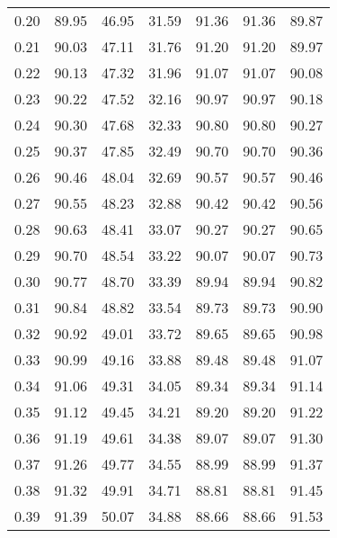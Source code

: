 \begin{tabular}{|c|c|c|c|c|c|c|}
      0.20 &     89.95 &     46.95 &      31.59 &   91.36 &      91.36 &         89.87 \\
      0.21 &     90.03 &     47.11 &      31.76 &   91.20 &      91.20 &         89.97 \\
      0.22 &     90.13 &     47.32 &      31.96 &   91.07 &      91.07 &         90.08 \\
      0.23 &     90.22 &     47.52 &      32.16 &   90.97 &      90.97 &         90.18 \\
      0.24 &     90.30 &     47.68 &      32.33 &   90.80 &      90.80 &         90.27 \\
      0.25 &     90.37 &     47.85 &      32.49 &   90.70 &      90.70 &         90.36 \\
      0.26 &     90.46 &     48.04 &      32.69 &   90.57 &      90.57 &         90.46 \\
      0.27 &     90.55 &     48.23 &      32.88 &   90.42 &      90.42 &         90.56 \\
      0.28 &     90.63 &     48.41 &      33.07 &   90.27 &      90.27 &         90.65 \\
      0.29 &     90.70 &     48.54 &      33.22 &   90.07 &      90.07 &         90.73 \\
      0.30 &     90.77 &     48.70 &      33.39 &   89.94 &      89.94 &         90.82 \\
      0.31 &     90.84 &     48.82 &      33.54 &   89.73 &      89.73 &         90.90 \\
      0.32 &     90.92 &     49.01 &      33.72 &   89.65 &      89.65 &         90.98 \\
      0.33 &     90.99 &     49.16 &      33.88 &   89.48 &      89.48 &         91.07 \\
      0.34 &     91.06 &     49.31 &      34.05 &   89.34 &      89.34 &         91.14 \\
      0.35 &     91.12 &     49.45 &      34.21 &   89.20 &      89.20 &         91.22 \\
      0.36 &     91.19 &     49.61 &      34.38 &   89.07 &      89.07 &         91.30 \\
      0.37 &     91.26 &     49.77 &      34.55 &   88.99 &      88.99 &         91.37 \\
      0.38 &     91.32 &     49.91 &      34.71 &   88.81 &      88.81 &         91.45 \\
      0.39 &     91.39 &     50.07 &      34.88 &   88.66 &      88.66 &         91.53 \\

\end{tabular}
